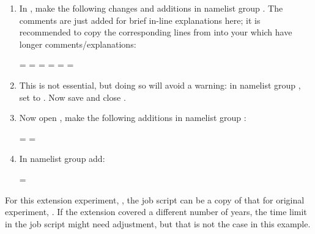 \begin{enumerate}
    \item In , make the following changes and additions in namelist group .
        The comments are just added for brief in-line explanations here; it is recommended to copy the corresponding lines from  into your  which have longer comments/explanations:

\begingroup\footnotesize
\begin{VerbatimNML}[samepage=true]
        =   
        =  
       = \nmltrue{}
       =  
    = 
 =  
\end{VerbatimNML}
\endgroup

    \item This is not essential, but doing so will avoid a warning: in namelist group , set  to \nmlfalse{}.
    Now save and close .

    \item Now open , make the following additions in namelist group :

\begin{VerbatimNML}[samepage=true]
    = 
 = 
\end{VerbatimNML}

    \item In namelist group  add:

\begin{VerbatimNML}
 = 
\end{VerbatimNML}

\end{enumerate}

For this extension experiment, , the job script can be a copy of that for original experiment, .
If the extension covered a different number of years, the time limit in the job script might need adjustment, but that is not the case in this example.

